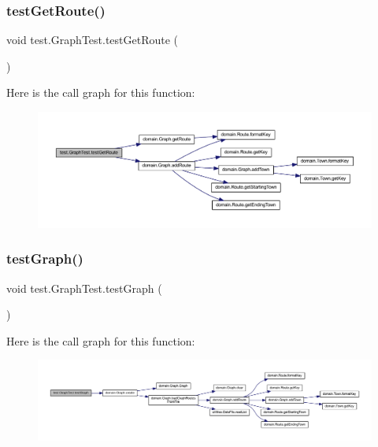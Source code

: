 \subsubsection{\texorpdfstring{test\+Get\+Route()}{testGetRoute()}}
{\footnotesize\ttfamily void test.\+Graph\+Test.\+test\+Get\+Route (\begin{DoxyParamCaption}{ }\end{DoxyParamCaption})}

Here is the call graph for this function\+:\nopagebreak
\begin{figure}[H]
\begin{center}
\leavevmode
\includegraphics[width=350pt]{classtest_1_1_graph_test_a44c05e3ce8e8f248813e7f7073b83b40_cgraph}
\end{center}
\end{figure}
\mbox{\label{classtest_1_1_graph_test_a1424d27d4fc5a3dca08a058d4d49a53a}} 
\subsubsection{\texorpdfstring{test\+Graph()}{testGraph()}}
{\footnotesize\ttfamily void test.\+Graph\+Test.\+test\+Graph (\begin{DoxyParamCaption}{ }\end{DoxyParamCaption})}

Here is the call graph for this function\+:\nopagebreak
\begin{figure}[H]
\begin{center}
\leavevmode
\includegraphics[width=350pt]{classtest_1_1_graph_test_a1424d27d4fc5a3dca08a058d4d49a53a_cgraph}
\end{center}
\end{figure}
\mbox{\label{classtest_1_1_graph_test_a35b38c797fb3d3c1ffc0e3ebaf9c36b2}} 
